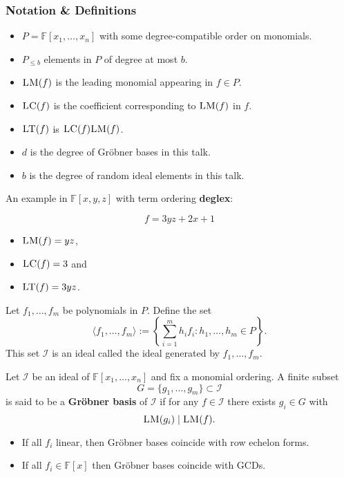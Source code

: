 \documentclass[10pt]{beamer}
\renewcommand{\emph}[1]{{\bf #1}}
\newcommand{\ideal}[1]{\langle {#1} \rangle}
\newcommand{\field}[1]{\mathbb{#1}}
\newcommand{\F}{\field{F}}
\newcommand{\LT}[1]{\ensuremath{\textsc{LT}(#1)\xspace}}
\newcommand{\LM}[1]{\ensuremath{\textsc{LM}(#1)\xspace}}
\newcommand{\LC}[1]{\ensuremath{\textsc{LC}(#1)\xspace}}
\newcommand{\FX}{\ensuremath{{{\F}[x_1,\dots,x_n]}}}
\newcommand{\sys}{\ensuremath{f_1,\dots,f_m}\xspace}
\newcommand{\I}{\ensuremath{\mathcal{I}}\xspace}
\renewcommand{\emph}[1]{\textbf{#1}}
\begin{document}
\begin{frame}[allowframebreaks]
\frametitle{Notation \& Definitions}
\begin{itemize}
 \item $P = \FX$ with some degree-compatible order on monomials.
 \item $P_{\leq b}$ elements in $P$ of degree at most $b$.
 \item $\LM{f}$ is the leading monomial appearing in $f \in P$.
 \item $\LC{f}$ is the coefficient corresponding to $\LM{f}$ in $f$.
 \item $\LT{f}$ is $\LC{f}\LM{f}$.
 \item $d$ is the degree of Gröbner bases in this talk.
 \item $b$ is the degree of random ideal elements in this talk.
\end{itemize}

\framebreak

An example in $\F[x,y,z]$ with term ordering \emph{deglex}:

\[f = 3yz + 2x + 1\]

\begin{itemize}
 \item $\LM{f} = yz$,
 \item $\LC{f} = 3$ and
 \item $\LT{f} = 3yz$.
\end{itemize}

\framebreak

\begin{definition}
Let \sys be polynomials in $P$. Define the set
\[
\ideal{\sys} := \left\{ \sum_{i=1}^{m} h_i f_i : h_1 ,\dots , h_m \in P \right\}.
\]
This set $\I$ is an ideal called the ideal generated by $f_1, \dots, f_m$.
\end{definition}

\framebreak

\begin{definition}
Let $\I$ be an ideal of $\FX$ and fix a monomial ordering. A finite subset $$G = \{g_1 ,\dots , g_m \} \subset \I$$  is said to be a \emph{Gr\"obner basis} of $\mathcal{I}$ if for any $f \in \I$ there exists $g_i \in G$ with $$\LM{g_i} \mid \LM{f}.$$
\end{definition}

\vspace{0.5em}

\begin{itemize}
 \item If all $f_i$ linear, then Gröbner bases coincide with row echelon forms. 
 \item If all $f_i \in \F[x]$ then Gröbner bases coincide with GCDs.
\end{itemize}




\end{frame}
\end{document}

